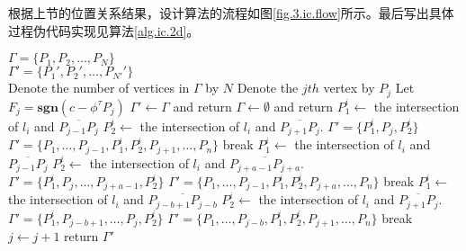 根据上节的位置关系结果，设计算法的流程如图\ref{fig.3.ic.flow}所示。最后写出具体过程伪代码实现见算法\ref{alg.ic.2d}。
\begin{algo}%
\caption{$\mathbf{AddLinear2D}$}
\label{alg.ic.2d}
\begin{algorithmic}
\REQUIRE $\Gamma=\{P_{1},P_{2},\ldots,P_{N}\}$\\
\ENSURE $\Gamma'=\{P_{1}',P_{2}',\ldots,P_{N'}'\}$\\
\STATE Denote the number of vertices in $\Gamma$ by $N$
	\STATE Denote the $jth$ vertex by $P_{j}$
	\STATE Let $F_{j}=\mathbf{sgn}(c-\phi^{\tau}P_{j})$
\ENDFOR
{}
	\STATE $\Gamma'\leftarrow\Gamma$ and return
	\STATE $\Gamma\leftarrow\emptyset$ and return
\ENDIF
{}
		\STATE $P_{1}^{i}\leftarrow$ the intersection of $l_{i}$ and $\overline{P_{j-1}P_{j}}$
		\STATE $P_{2}^{i}\leftarrow$ the intersection of $l_{i}$ and $\overline{P_{j+1}P_{j}}$.
			\STATE$\Gamma'=\{P_{1}^{i},P_{j},P_{2}^{i}\}$
		\ELSE
			\STATE$\Gamma'=\{P_{1},\ldots,P_{j-1},P_{1}^{i},P_{2}^{i},P_{j+1},\ldots,P_{n}\}$
		\ENDIF
        \STATE break
		\STATE $P_{1}^{i}\leftarrow$ the intersection of $l_{i}$ and $\overline{P_{j-1}P_{j}}$
		\STATE $P_{2}^{i}\leftarrow$ the intersection of $l_{i}$ and $\overline{P_{j+a-1}P_{j+a}}$.
			\STATE$\Gamma'=\{P_{1}^{i},P_{j},\ldots,P_{j+a-1},P_{2}^{i}\}$
		\ELSE
			\STATE$\Gamma'=\{P_{1},\ldots,P_{j-1},P_{1}^{i},P_{2}^{i},P_{j+a},\ldots,P_{n}\}$
		\ENDIF
        \STATE break
		\STATE $P_{1}^{i}\leftarrow$ the intersection of $l_{i}$ and $\overline{P_{j-b+1}P_{j-b}}$
		\STATE $P_{2}^{i}\leftarrow$ the intersection of $l_{i}$ and $\overline{P_{j+1}P_{j}}$.
			\STATE$\Gamma'=\{P_{1}^{i},P_{j-b+1},\ldots,P_{j},P_{2}^{i}\}$
		\ELSE
			\STATE$\Gamma'=\{P_{1},\ldots,P_{j-b},P_{1}^{i},P_{2}^{i},P_{j+1},\ldots,P_{n}\}$
		\ENDIF
        \STATE break
    \ENDIF
	\STATE $j\leftarrow j+1$
\ENDFOR
\STATE return $\Gamma'$
\end{algorithmic}
\end{algo}

